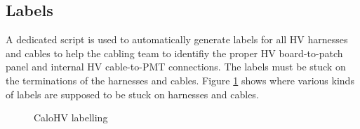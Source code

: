 \subsection{Labels}

A dedicated script is used to automatically generate labels for  all HV harnesses
and  cables to  help  the  cabling team  to  identifiy  the proper  HV
board-to-patch panel  and internal  HV cable-to-PMT  connections.  The
labels must be stuck  on the terminations of the harnesses
and cables.
Figure \ref{fig:calohv:labels:1} shows where various kinds of
labels are supposed to be stuck on harnesses and cables.

\begin{figure}[h!]
  \begin{center}
    \scalebox{0.75}{}
  \end{center}
  \caption{CaloHV labelling}
  \label{fig:calohv:labels:1}
\end{figure}





